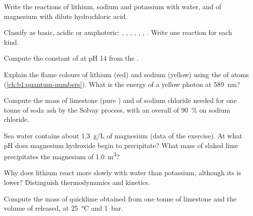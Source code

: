 \begin{exercise}[$\star$]\label{exo:b1:s-block:2}
Write the reactions of lithium, sodium and potassium with water, and of
magnesium with dilute hydrochloric acid.
\end{exercise}

\begin{exercise}[$\star$]\label{exo:b1:s-block:3}
Classify as basic, acidic or amphoteric: , , ,
, , , . Write one reaction for each kind.
\end{exercise}

\begin{exercise}[$\star$]\label{exo:b1:s-block:4}
Compute the constant of  at pH 14 from the
.
\end{exercise}

\begin{exercise}[$\star\star$]\label{exo:b1:s-block:5}
Explain the flame colours of lithium (red) and sodium (yellow) using the
 of atoms (\cref{ch:b1:quantum-numbers}). What is the energy
of a yellow photon at \qty{589}{nm}?
\end{exercise}

\begin{exercise}[$\star\star$]\label{exo:b1:s-block:6}
Compute the mass of limestone (pure ) and of sodium chloride
needed for one tonne of soda ash by the Solvay process, with an overall
 of \qty{90}{\percent} on sodium chloride.
\end{exercise}

\begin{exercise}[$\star\star$]\label{exo:b1:s-block:7}
Sea water contains about \qty{1.3}{g/L} of magnesium (data of the
exercise). At what pH does magnesium hydroxide begin to precipitate?
What mass of slaked lime precipitates the magnesium of \qty{1.0}{m^3}?
\end{exercise}

\begin{exercise}[$\star\star$]\label{exo:b1:s-block:8}
Why does lithium react more slowly with water than potassium, although
its  is lower? Distinguish thermodynamics and kinetics.
\end{exercise}

\begin{exercise}[$\star\star$]\label{exo:b1:s-block:9}
Compute the mass of quicklime obtained from one tonne of limestone and the
volume of  released, at \qty{25}{\celsius} and \qty{1}{bar}.
\end{exercise}

